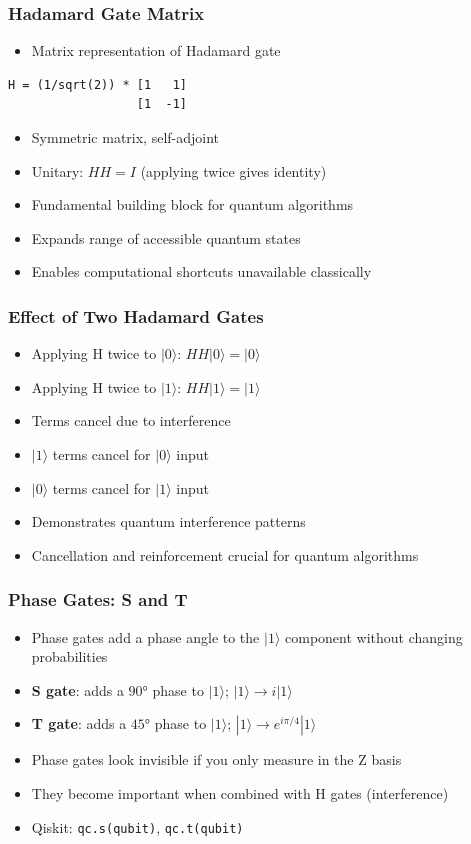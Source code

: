 \begin{frame}[fragile]\frametitle{Hadamard Gate Matrix}
\begin{itemize}
\item Matrix representation of Hadamard gate
\end{itemize}
\begin{lstlisting}
H = (1/sqrt(2)) * [1   1]
                  [1  -1]
\end{lstlisting}
\begin{itemize}
\item Symmetric matrix, self-adjoint
\item Unitary: $HH = I$ (applying twice gives identity)
\item Fundamental building block for quantum algorithms
\item Expands range of accessible quantum states
\item Enables computational shortcuts unavailable classically
\end{itemize}
\end{frame}

\begin{frame}[fragile]\frametitle{Effect of Two Hadamard Gates}
\begin{itemize}
\item Applying H twice to $|0\rangle$: $HH|0\rangle = |0\rangle$
\item Applying H twice to $|1\rangle$: $HH|1\rangle = |1\rangle$
\item Terms cancel due to interference
\item $|1\rangle$ terms cancel for $|0\rangle$ input
\item $|0\rangle$ terms cancel for $|1\rangle$ input
\item Demonstrates quantum interference patterns
\item Cancellation and reinforcement crucial for quantum algorithms
\end{itemize}
\end{frame}

\begin{frame}[fragile]\frametitle{Phase Gates: S and T}
\begin{itemize}
\item Phase gates add a phase angle to the $|1\rangle$ component without changing probabilities
\item \textbf{S gate}: adds a $90°$ phase to $|1\rangle$; $|1\rangle \to i|1\rangle$
\item \textbf{T gate}: adds a $45°$ phase to $|1\rangle$; $|1\rangle \to e^{i\pi/4}|1\rangle$
\item Phase gates look invisible if you only measure in the Z basis
\item They become important when combined with H gates (interference)
\item Qiskit: \texttt{qc.s(qubit)}, \texttt{qc.t(qubit)}
\end{itemize}
\end{frame}


